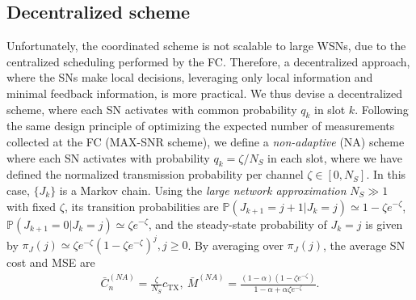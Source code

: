 \documentclass[10pt,twocolumn,twoside]{IEEEtran}
\theoremstyle{plain}
\begin{document}
 \subsection{Decentralized scheme}
 \label{distscheme}
\noindent  Unfortunately, the coordinated scheme is not scalable to large WSNs,
 due to the centralized scheduling performed by the FC.
 Therefore, a decentralized approach, where the SNs make local decisions, leveraging only local information
 and minimal feedback information, is more practical.
 We thus devise
a decentralized scheme, where each SN activates with common probability $q_k$ in slot $k$.
 Following the same design principle of optimizing the expected number of measurements collected at the FC (MAX-SNR scheme),
we define a  \emph{non-adaptive} (NA) scheme where each
 SN activates with probability $q_k{=}\zeta/N_S$ in each slot, where we have defined the normalized transmission probability per channel $\zeta{\in}[0,N_S]$.
In this case, $\{J_k\}$ is a Markov chain.
Using the \emph{large network approximation} $N_S{\gg}1$ with fixed $\zeta$,
its transition probabilities are
$\mathbb P(J_{k+1}{=}j{+}1|J_k{=}j){\simeq}1{-}\zeta e^{-\zeta}$,
 $\mathbb P(J_{k+1}{=}0|J_k{=}j){\simeq}\zeta e^{-\zeta}$,
 and the steady-state probability of $J_k{=}j$ is given by   $\pi_J(j){\simeq}\zeta e^{-\zeta}(1-\zeta e^{-\zeta})^j,j{\geq}0$.
 By averaging over $\pi_J(j)$,
 the average SN cost and MSE
 are
 \begin{align}
\bar C_n^{(NA)}=\frac{\zeta}{N_S}c_{\mathrm{TX}},\ 
\bar M^{(NA)}=\frac{(1-\alpha)(1-\zeta e^{-\zeta})}{1-\alpha+\alpha\zeta e^{-\zeta}}.
\label{NA}
 \end{align}
 
\end{document}
